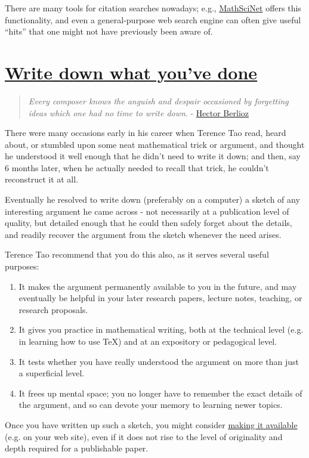 \documentclass{book}
\numberwithin{equation}{section}
\begin{document}
There are many tools for citation searches nowadays; e.g., \href{http://www.ams.org/mathscinet/search.html}{MathSciNet} offers this functionality, and even a general-purpose web search engine can often give useful ``hits'' that one might not have previously been aware of.

\section{\href{https://terrytao.wordpress.com/career-advice/write-down-what-youve-done/}{Write down what you've done}}
\begin{quotation}
    \textit{Every composer knows the anguish and despair occasioned by forgetting ideas which one had no time to write down}. - \href{https://en.wikipedia.org/wiki/Hector_Berlioz}{Hector Berlioz}
\end{quotation}
There were many occasions early in his career when Terence Tao read, heard about, or stumbled upon some neat mathematical trick or argument, and thought he understood it well enough that he didn't need to write it down; and then, say 6 months later, when he actually needed to recall that trick, he couldn't reconstruct it at all.

Eventually he resolved to write down (preferably on a computer) a sketch of any interesting argument he came across - not necessarily at a publication level of quality, but detailed enough that he could then safely forget about the details, and readily recover the argument from the sketch whenever the need arises.

%
Terence Tao recommend that you do this also, as it serves several useful purposes:
\begin{enumerate}
    \item It makes the argument permanently available to you in the future, and may eventually be helpful in your later research papers, lecture notes, teaching, or research proposals.
    \item It gives you practice in mathematical writing, both at the technical level (e.g. in learning how to use TeX) and at an expository or pedagogical level.
    \item It tests whether you have really understood the argument on more than just a superficial level.
    \item It frees up mental space; you no longer have to remember the exact details of the argument, and so can devote your memory to learning newer topics.
\end{enumerate}
Once you have written up such a sketch, you might consider \href{https://terrytao.wordpress.com/career-advice/make-your-work-available/}{making it available} (e.g. on your web site), even if it does not rise to the level of originality and depth required for a publishable paper.
\end{document}
